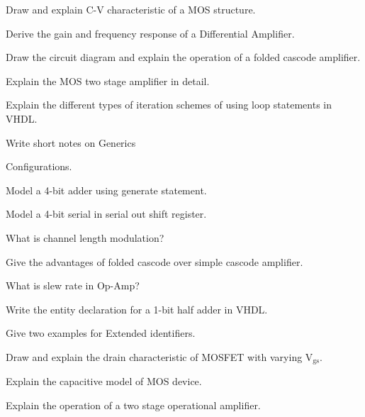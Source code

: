 \markB

\newpage \again
  
\partC

\item \iitem Draw and explain C-V characteristic of a MOS structure.
  \Or
\item Derive the gain and frequency response of a Differential Amplifier.
  \ene

\item \iitem Draw the circuit diagram and explain the operation of a
  folded cascode amplifier.
  \Or
\item Explain the MOS two stage amplifier in detail.
\ene
  
\item \iitem Explain the different types of iteration schemes of using loop
  statements in VHDL.
\Or
\item Write short notes on
\iitem Generics \item Configurations. \ene
\ene

\item \iitem Model a 4-bit adder using generate statement.
\Or
\item Model a 4-bit serial in serial out shift register.
  \ene
  \markC
  \ene



\sub{\subj}

\maxtime


\partA


\iitem What is channel length modulation?

\item Give the advantages of folded cascode over simple cascode amplifier.

\item What is slew rate in Op-Amp?

\item Write the entity declaration for a 1-bit half adder in VHDL.

\item Give two examples for Extended identifiers.

\markA
\partB

\item Draw and explain the drain characteristic of MOSFET with varying V$_{\text{gs}}$.

\item Explain the capacitive model of MOS device.

\item Explain the operation of a two stage operational amplifier.

